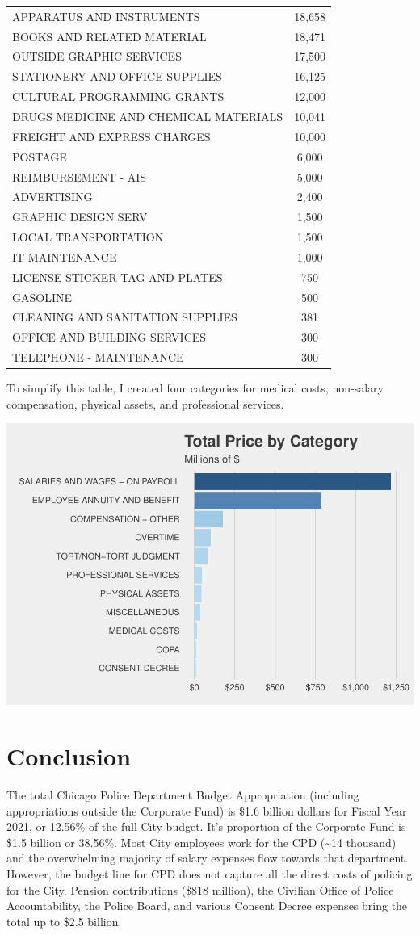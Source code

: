 \documentclass[
]{article}
\begin{document}
\begin{longtable}[]{@{}lc@{}}
APPARATUS AND INSTRUMENTS & 18,658\tabularnewline
BOOKS AND RELATED MATERIAL & 18,471\tabularnewline
OUTSIDE GRAPHIC SERVICES & 17,500\tabularnewline
STATIONERY AND OFFICE SUPPLIES & 16,125\tabularnewline
CULTURAL PROGRAMMING GRANTS & 12,000\tabularnewline
DRUGS MEDICINE AND CHEMICAL MATERIALS & 10,041\tabularnewline
FREIGHT AND EXPRESS CHARGES & 10,000\tabularnewline
POSTAGE & 6,000\tabularnewline
REIMBURSEMENT - AIS & 5,000\tabularnewline
ADVERTISING & 2,400\tabularnewline
GRAPHIC DESIGN SERV & 1,500\tabularnewline
LOCAL TRANSPORTATION & 1,500\tabularnewline
IT MAINTENANCE & 1,000\tabularnewline
LICENSE STICKER TAG AND PLATES & 750\tabularnewline
GASOLINE & 500\tabularnewline
CLEANING AND SANITATION SUPPLIES & 381\tabularnewline
OFFICE AND BUILDING SERVICES & 300\tabularnewline
TELEPHONE - MAINTENANCE & 300\tabularnewline
\bottomrule
\end{longtable}

To simplify this table, I created four categories for medical costs,
non-salary compensation, physical assets, and professional services.

\begin{center}\includegraphics{cpd_budget_analysis_files/figure-latex/total price by category reduced-1} \end{center}

\hypertarget{conclusion}{%
\section{Conclusion}\label{conclusion}}

The total Chicago Police Department Budget Appropriation (including
appropriations outside the Corporate Fund) is \$1.6 billion dollars for
Fiscal Year 2021, or 12.56\% of the full City budget. It's proportion of
the Corporate Fund is \$1.5 billion or 38.56\%. Most City employees work
for the CPD (\textasciitilde14 thousand) and the overwhelming majority
of salary expenses flow towards that department. However, the budget
line for CPD does not capture all the direct costs of policing for the
City. Pension contributions (\$818 million), the Civilian Office of
Police Accountability, the Police Board, and various Consent Decree
expenses bring the total up to \$2.5 billion.
\end{document}
